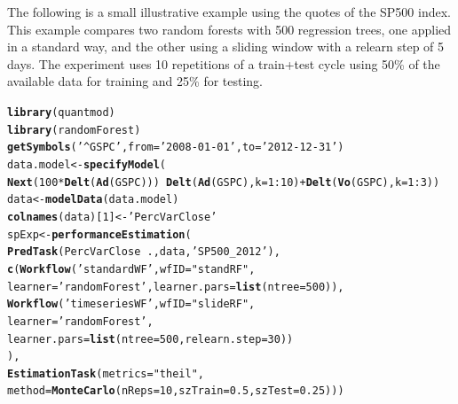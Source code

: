 \documentclass[10pt,a4paper]{article}\usepackage[]{graphicx}\usepackage[]{color}
\makeatletter
\newcommand{\hlnum}[1]{\textcolor[rgb]{0.686,0.059,0.569}{#1}}%
\newcommand{\hlstr}[1]{\textcolor[rgb]{0.192,0.494,0.8}{#1}}%
\newcommand{\hlopt}[1]{\textcolor[rgb]{0,0,0}{#1}}%
\newcommand{\hlstd}[1]{\textcolor[rgb]{0.345,0.345,0.345}{#1}}%
\newcommand{\hlkwb}[1]{\textcolor[rgb]{0.69,0.353,0.396}{#1}}%
\newcommand{\hlkwc}[1]{\textcolor[rgb]{0.333,0.667,0.333}{#1}}%
\newcommand{\hlkwd}[1]{\textcolor[rgb]{0.737,0.353,0.396}{\textbf{#1}}}%
\newenvironment{kframe}{%
 \def\at@end@of@kframe{}%
 \ifinner\ifhmode%
  \def\at@end@of@kframe{\end{minipage}}%
  \begin{minipage}{\columnwidth}%
 \fi\fi%
 \def\FrameCommand##1{\hskip\@totalleftmargin \hskip-\fboxsep
 \colorbox{shadecolor}{##1}\hskip-\fboxsep
     \hskip-\linewidth \hskip-\@totalleftmargin \hskip\columnwidth}%
 \MakeFramed {\advance\hsize-\width
   \@totalleftmargin\z@ \linewidth\hsize
   \@setminipage}}%
 {\par\unskip\endMakeFramed%
 \at@end@of@kframe}
\newenvironment{knitrout}{}{} %
\makeatother
\begin{document}
The following is a small illustrative example using the quotes of the
SP500 index. This example compares two random forests with 500
regression trees, one applied in a standard way, and the other using
a sliding window with a relearn step of 5 days. The experiment
uses 10 repetitions of a train+test cycle using 50\% of the available
data for training and 25\% for testing.

\begin{knitrout}\small
{}\color{fgcolor}\begin{kframe}
\begin{alltt}
\hlkwd{library}\hlstd{(quantmod)}
\hlkwd{library}\hlstd{(randomForest)}
\hlkwd{getSymbols}\hlstd{(}\hlstr{'^GSPC'}\hlstd{,}\hlkwc{from}\hlstd{=}\hlstr{'2008-01-01'}\hlstd{,}\hlkwc{to}\hlstd{=}\hlstr{'2012-12-31'}\hlstd{)}
\hlstd{data.model} \hlkwb{<-} \hlkwd{specifyModel}\hlstd{(}
  \hlkwd{Next}\hlstd{(}\hlnum{100}\hlopt{*}\hlkwd{Delt}\hlstd{(}\hlkwd{Ad}\hlstd{(GSPC)))} \hlopt{~} \hlkwd{Delt}\hlstd{(}\hlkwd{Ad}\hlstd{(GSPC),}\hlkwc{k}\hlstd{=}\hlnum{1}\hlopt{:}\hlnum{10}\hlstd{)}\hlopt{+}\hlkwd{Delt}\hlstd{(}\hlkwd{Vo}\hlstd{(GSPC),}\hlkwc{k}\hlstd{=}\hlnum{1}\hlopt{:}\hlnum{3}\hlstd{))}
\hlstd{data} \hlkwb{<-} \hlkwd{modelData}\hlstd{(data.model)}
\hlkwd{colnames}\hlstd{(data)[}\hlnum{1}\hlstd{]} \hlkwb{<-} \hlstr{'PercVarClose'}
\hlstd{spExp} \hlkwb{<-} \hlkwd{performanceEstimation}\hlstd{(}
  \hlkwd{PredTask}\hlstd{(PercVarClose} \hlopt{~} \hlstd{.,data,}\hlstr{'SP500_2012'}\hlstd{),}
  \hlkwd{c}\hlstd{(}\hlkwd{Workflow}\hlstd{(}\hlstr{'standardWF'}\hlstd{,}\hlkwc{wfID}\hlstd{=}\hlstr{"standRF"}\hlstd{,}
             \hlkwc{learner}\hlstd{=}\hlstr{'randomForest'}\hlstd{,}\hlkwc{learner.pars}\hlstd{=}\hlkwd{list}\hlstd{(}\hlkwc{ntree}\hlstd{=}\hlnum{500}\hlstd{)),}
    \hlkwd{Workflow}\hlstd{(}\hlstr{'timeseriesWF'}\hlstd{,}\hlkwc{wfID}\hlstd{=}\hlstr{"slideRF"}\hlstd{,}
             \hlkwc{learner}\hlstd{=}\hlstr{'randomForest'}\hlstd{,}
             \hlkwc{learner.pars}\hlstd{=}\hlkwd{list}\hlstd{(}\hlkwc{ntree}\hlstd{=}\hlnum{500}\hlstd{,}\hlkwc{relearn.step}\hlstd{=}\hlnum{30}\hlstd{))}
   \hlstd{),}
  \hlkwd{EstimationTask}\hlstd{(}\hlkwc{metrics}\hlstd{=}\hlstr{"theil"}\hlstd{,}
                 \hlkwc{method}\hlstd{=}\hlkwd{MonteCarlo}\hlstd{(}\hlkwc{nReps}\hlstd{=}\hlnum{10}\hlstd{,}\hlkwc{szTrain}\hlstd{=}\hlnum{0.5}\hlstd{,}\hlkwc{szTest}\hlstd{=}\hlnum{0.25}\hlstd{)))}
\end{alltt}
\end{kframe}
\end{knitrout}
\end{document}
